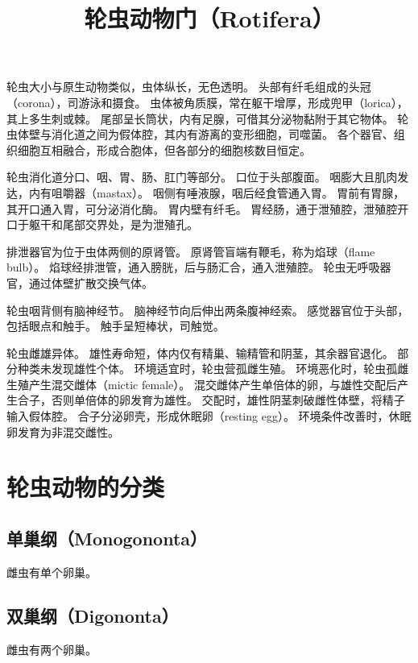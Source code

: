 \documentclass[11pt]{article}
\title{轮虫动物门（Rotifera）}
\date{}
\begin{document}
  \maketitle

  \linenumbers
轮虫大小与原生动物类似，虫体纵长，无色透明。
头部有纤毛组成的头冠（corona），司游泳和摄食。
虫体被角质膜，常在躯干增厚，形成兜甲（lorica），其上多生刺或棘。
尾部呈长筒状，内有足腺，可借其分泌物黏附于其它物体。
轮虫体壁与消化道之间为假体腔，其内有游离的变形细胞，司噬菌。
各个器官、组织细胞互相融合，形成合胞体，但各部分的细胞核数目恒定。

\newline

轮虫消化道分口、咽、胃、肠、肛门等部分。
口位于头部腹面。
咽膨大且肌肉发达，内有咀嚼器（mastax）。
咽侧有唾液腺，咽后经食管通入胃。
胃前有胃腺，其开口通入胃，可分泌消化酶。
胃内壁有纤毛。
胃经肠，通于泄殖腔，泄殖腔开口于躯干和尾部交界处，是为泄殖孔。

\newline

排泄器官为位于虫体两侧的原肾管。
原肾管盲端有鞭毛，称为焰球（flame bulb）。
焰球经排泄管，通入膀胱，后与肠汇合，通入泄殖腔。
轮虫无呼吸器官，通过体壁扩散交换气体。

\newline

轮虫咽背侧有脑神经节。
脑神经节向后伸出两条腹神经索。
感觉器官位于头部，包括眼点和触手。
触手呈短棒状，司触觉。

\newline

轮虫雌雄异体。
雄性寿命短，体内仅有精巢、输精管和阴茎，其余器官退化。
部分种类未发现雄性个体。
环境适宜时，轮虫营孤雌生殖。
环境恶化时，轮虫孤雌生殖产生混交雌体（mictic female）。
混交雌体产生单倍体的卵，与雄性交配后产生合子，否则单倍体的卵发育为雄性。
交配时，雄性阴茎刺破雌性体壁，将精子输入假体腔。
合子分泌卵壳，形成休眠卵（resting egg）。
环境条件改善时，休眠卵发育为非混交雌性。

\section{轮虫动物的分类}
\subsection{单巢纲（Monogononta）}
雌虫有单个卵巢。

\subsection{双巢纲（Digononta）}
雌虫有两个卵巢。
\end{document}
